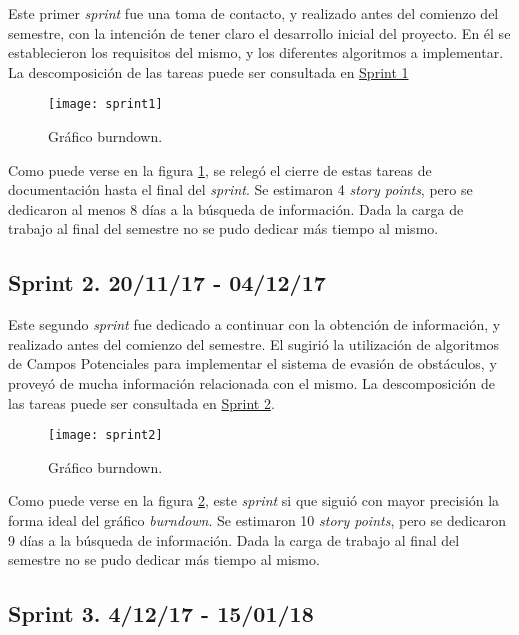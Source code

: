 Este primer \emph{sprint} fue una toma de contacto, y realizado antes del comienzo del semestre, con la intención de tener claro el desarrollo inicial del proyecto. 
En él se establecieron los requisitos del mismo, y los diferentes algoritmos a implementar. 
La descomposición de las tareas puede ser consultada en \href{https://github.com/mbm0089/gii_0_17.02_snsi/milestone/1?closed=1}{Sprint 1}

\begin{figure}[H]
	\centering
	\texttt{[image: sprint1]}
	\caption[Burndown Sprint 1]{Gráfico burndown.}\label{fig:sprint1}
\end{figure}

Como puede verse en la figura \ref{fig:sprint1}, se relegó el cierre de estas tareas de documentación hasta el final del \emph{sprint}.
Se estimaron 4 \emph{story points}, pero se dedicaron al menos 8 días a la búsqueda de información. Dada la carga de trabajo al final del semestre no se pudo dedicar más tiempo al mismo.

\subsection{Sprint 2. 20/11/17 - 04/12/17}

Este segundo \emph{sprint} fue dedicado a continuar con la obtención de información, y realizado antes del comienzo del semestre.
El \tutor{} sugirió la utilización de algoritmos de Campos Potenciales para implementar el sistema de evasión de obstáculos, y proveyó de mucha información relacionada con el mismo.
La descomposición de las tareas puede ser consultada en \href{https://github.com/mbm0089/gii_0_17.02_snsi/milestone/2?closed=1}{Sprint 2}.

\begin{figure}[H]
	\centering
	\texttt{[image: sprint2]}
	\caption[Burndown Sprint 2]{Gráfico burndown.}\label{fig:sprint2}
\end{figure}

Como puede verse en la figura \ref{fig:sprint2}, este \emph{sprint} si que siguió con mayor precisión la forma ideal del gráfico \emph{burndown}.
Se estimaron 10 \emph{story points}, pero se dedicaron 9 días a la búsqueda de información. Dada la carga de trabajo al final del semestre no se pudo dedicar más tiempo al mismo.

\subsection{Sprint 3. 4/12/17 - 15/01/18}

